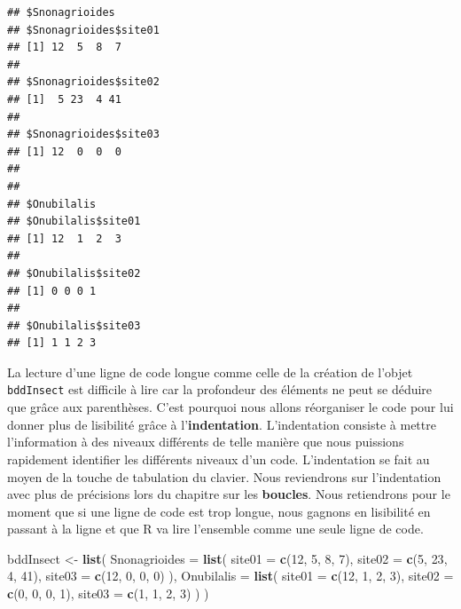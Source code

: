 \documentclass[
]{book}
\newenvironment{Shaded}{\begin{snugshade}}{\end{snugshade}}
\newcommand{\DataTypeTok}[1]{\textcolor[rgb]{0.13,0.29,0.53}{#1}}
\newcommand{\DecValTok}[1]{\textcolor[rgb]{0.00,0.00,0.81}{#1}}
\newcommand{\KeywordTok}[1]{\textcolor[rgb]{0.13,0.29,0.53}{\textbf{#1}}}
\newcommand{\NormalTok}[1]{#1}
\newcommand{\StringTok}[1]{\textcolor[rgb]{0.31,0.60,0.02}{#1}}
\begin{document}
\begin{verbatim}
## $Snonagrioides
## $Snonagrioides$site01
## [1] 12  5  8  7
## 
## $Snonagrioides$site02
## [1]  5 23  4 41
## 
## $Snonagrioides$site03
## [1] 12  0  0  0
## 
## 
## $Onubilalis
## $Onubilalis$site01
## [1] 12  1  2  3
## 
## $Onubilalis$site02
## [1] 0 0 0 1
## 
## $Onubilalis$site03
## [1] 1 1 2 3
\end{verbatim}

La lecture d'une ligne de code longue comme celle de la création de l'objet \texttt{bddInsect} est difficile à lire car la profondeur des éléments ne peut se déduire que grâce aux parenthèses. C'est pourquoi nous allons réorganiser le code pour lui donner plus de lisibilité grâce à l'\textbf{indentation}. L'indentation consiste à mettre l'information à des niveaux différents de telle manière que nous puissions rapidement identifier les différents niveaux d'un code. L'indentation se fait au moyen de la touche de tabulation du clavier. Nous reviendrons sur l'indentation avec plus de précisions lors du chapitre sur les \textbf{boucles}. Nous retiendrons pour le moment que si une ligne de code est trop longue, nous gagnons en lisibilité en passant à la ligne et que R va lire l'ensemble comme une seule ligne de code.

\begin{Shaded}
\begin{Highlighting}[]
\NormalTok{bddInsect <-}\StringTok{ }\KeywordTok{list}\NormalTok{(}
  \DataTypeTok{Snonagrioides =} \KeywordTok{list}\NormalTok{(}
    \DataTypeTok{site01 =} \KeywordTok{c}\NormalTok{(}\DecValTok{12}\NormalTok{, }\DecValTok{5}\NormalTok{, }\DecValTok{8}\NormalTok{, }\DecValTok{7}\NormalTok{), }
    \DataTypeTok{site02 =} \KeywordTok{c}\NormalTok{(}\DecValTok{5}\NormalTok{, }\DecValTok{23}\NormalTok{, }\DecValTok{4}\NormalTok{, }\DecValTok{41}\NormalTok{), }
    \DataTypeTok{site03 =} \KeywordTok{c}\NormalTok{(}\DecValTok{12}\NormalTok{, }\DecValTok{0}\NormalTok{, }\DecValTok{0}\NormalTok{, }\DecValTok{0}\NormalTok{)}
\NormalTok{  ), }
  \DataTypeTok{Onubilalis =} \KeywordTok{list}\NormalTok{(}
    \DataTypeTok{site01 =} \KeywordTok{c}\NormalTok{(}\DecValTok{12}\NormalTok{, }\DecValTok{1}\NormalTok{, }\DecValTok{2}\NormalTok{, }\DecValTok{3}\NormalTok{), }
    \DataTypeTok{site02 =} \KeywordTok{c}\NormalTok{(}\DecValTok{0}\NormalTok{, }\DecValTok{0}\NormalTok{, }\DecValTok{0}\NormalTok{, }\DecValTok{1}\NormalTok{), }
    \DataTypeTok{site03 =} \KeywordTok{c}\NormalTok{(}\DecValTok{1}\NormalTok{, }\DecValTok{1}\NormalTok{, }\DecValTok{2}\NormalTok{, }\DecValTok{3}\NormalTok{)}
\NormalTok{  )}
\NormalTok{)}
\end{Highlighting}
\end{Shaded}
\end{document}
